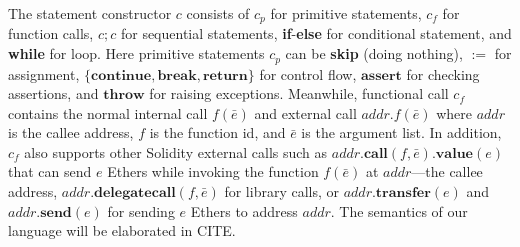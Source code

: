 The statement constructor $c$ consists of $c_p$ for primitive statements, $c_f$ for function calls, $c;c$ for sequential statements, \textbf{if}-\textbf{else} for conditional statement, and \textbf{while} for loop.  Here primitive statements $c_p$ can be \textbf{skip} (doing nothing), $:=$ for assignment, $\{\textbf{continue},\textbf{break},\textbf{return}\}$ for control flow, $\textbf{assert}$ for checking assertions, and $\textbf{throw}$ for raising exceptions. Meanwhile, functional call $c_f$ contains the normal internal call $f(\bar{e})$ and external call $\textit{addr}.f(\bar{e})$ where $\textit{addr}$ is the callee address, $f$ is the function id, and $\bar{e}$ is the argument list. In addition, $c_f$ also supports other Solidity external calls such as $\textit{addr}.\textbf{call}(f,\bar{e}).\textbf{value}(e)$ that can send $e$ Ethers while invoking the function $f(\bar{e})$ at $\textit{addr}$---the callee address,  $\textit{addr}.\textbf{delegatecall}(f,\bar{e})$ for library calls, or $\textit{addr}.\textbf{transfer}(e)$ and $\textit{addr}.\textbf{send}(e)$ for sending $e$ Ethers to address $\textit{addr}$. The semantics of our language will be elaborated in CITE.
